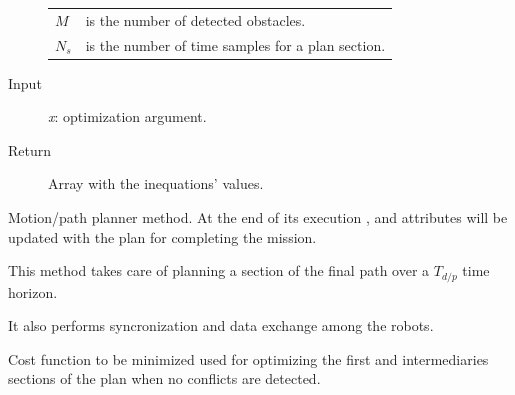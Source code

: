 \documentclass[letterpaper,10pt,english]{sphinxmanual}
\begin{document}
\begin{fulllineitems}
\begin{fulllineitems}
\begin{description}
\begin{tabulary}{\linewidth}{|L|L|}
\(M\)
 & 
is the number of detected obstacles.
\\

\(N_s\)
 & 
is the number of time samples for a plan section.
\\
\hline\end{tabulary}


\item[{Input}] \leavevmode
\emph{x}: optimization argument.

\item[{Return}] \leavevmode
Array with the inequations' values.

\end{description}

\end{fulllineitems}


\begin{fulllineitems}
\label{Multi-robot motion planner:planning_sim.Robot._plan}
Motion/path planner method. At the end of its execution {\hyperref[Multi-robot motion planner:planning_sim.Robot.rtime]{}}, {\hyperref[Multi-robot motion planner:planning_sim.Robot.ctime]{}}
and {\hyperref[Multi-robot motion planner:planning_sim.Robot.sol]{}} attributes will be updated with the plan for completing the mission.

\end{fulllineitems}


\begin{fulllineitems}
\label{Multi-robot motion planner:planning_sim.Robot._plan_section}
This method takes care of planning a section of the final path over a \(T_{d/p}\)
time horizon.

It also performs syncronization and data exchange among the robots.

\end{fulllineitems}


\begin{fulllineitems}
\label{Multi-robot motion planner:planning_sim.Robot._sa_criterion}
Cost function to be minimized used for optimizing
the first and intermediaries sections of the plan when no conflicts are detected.


\end{fulllineitems}
\end{fulllineitems}
\end{document}
